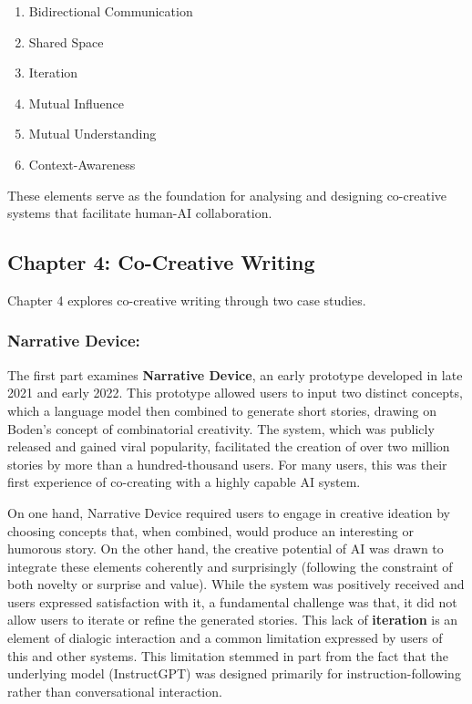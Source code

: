 \begin{enumerate}[label=\arabic.]
    \item Bidirectional Communication
    \item Shared Space
    \item Iteration
    \item Mutual Influence
    \item Mutual Understanding
    \item Context-Awareness
\end{enumerate}

These elements serve as the foundation for analysing and designing co-creative systems that facilitate human-AI collaboration.

\subsection{Chapter 4: Co-Creative Writing}

Chapter 4 explores co-creative writing through two case studies. 

\subsubsection{Narrative Device: } The first part examines \textbf{Narrative Device}, an early prototype developed in late 2021 and early 2022. This prototype allowed users to input two distinct concepts, which a language model then combined to generate short stories, drawing on Boden’s concept of combinatorial creativity. The system, which was publicly released and gained viral popularity, facilitated the creation of over two million stories by more than a hundred-thousand users. For many users, this was their first experience of co-creating with a highly capable AI system.

On one hand, Narrative Device required users to engage in creative ideation by choosing concepts that, when combined, would produce an interesting or humorous story. On the other hand, the creative potential of AI was drawn to integrate these elements coherently and surprisingly (following the constraint of both novelty or surprise and value). While the system was positively received and users expressed satisfaction with it, a fundamental challenge was that, it did not allow users to iterate or refine the generated stories. This lack of \textbf{iteration} is an element of dialogic interaction and a common limitation expressed by users of this and other systems. This limitation stemmed in part from the fact that the underlying model (InstructGPT) was designed primarily for instruction-following rather than conversational interaction.

